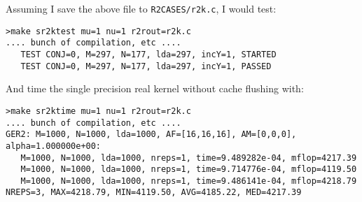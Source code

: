 \documentclass[11pt]{article}
\begin{document}
Assuming I save the above file to {\tt R2CASES/r2k.c}, I would test:
\begin{verbatim}
>make sr2ktest mu=1 nu=1 r2rout=r2k.c
.... bunch of compilation, etc ....
   TEST CONJ=0, M=297, N=177, lda=297, incY=1, STARTED
   TEST CONJ=0, M=297, N=177, lda=297, incY=1, PASSED
\end{verbatim}

And time the single precision real kernel without cache flushing with:
\begin{verbatim}
>make sr2ktime mu=1 nu=1 r2rout=r2k.c
.... bunch of compilation, etc ....
GER2: M=1000, N=1000, lda=1000, AF=[16,16,16], AM=[0,0,0], alpha=1.000000e+00:
   M=1000, N=1000, lda=1000, nreps=1, time=9.489282e-04, mflop=4217.39
   M=1000, N=1000, lda=1000, nreps=1, time=9.714776e-04, mflop=4119.50
   M=1000, N=1000, lda=1000, nreps=1, time=9.486141e-04, mflop=4218.79
NREPS=3, MAX=4218.79, MIN=4119.50, AVG=4185.22, MED=4217.39
\end{verbatim}
\end{document}
